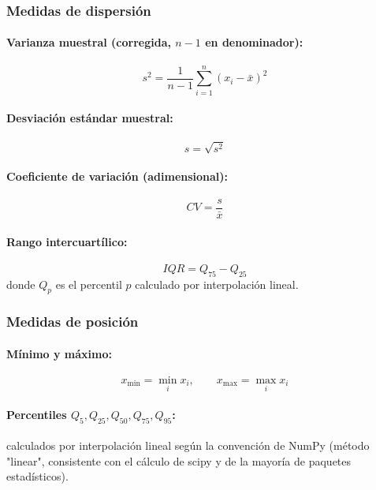 \documentclass[12pt,a4paper,oneside]{book}
\begin{document}
\subsubsection{Medidas de dispersión}

\paragraph{Varianza muestral (corregida, $n-1$ en denominador):}
\begin{equation}
s^2 = \frac{1}{n-1}\sum_{i=1}^{n}(x_i - \bar{x})^2
\end{equation}

\paragraph{Desviación estándar muestral:}
\begin{equation}
s = \sqrt{s^2}
\end{equation}

\paragraph{Coeficiente de variación (adimensional):}
\begin{equation}
CV = \frac{s}{\bar{x}}
\end{equation}

\paragraph{Rango intercuartílico:}
\begin{equation}
IQR = Q_{75} - Q_{25}
\end{equation}
donde $Q_p$ es el percentil $p$ calculado por interpolación lineal.

\subsubsection{Medidas de posición}

\paragraph{Mínimo y máximo:}
\begin{equation}
x_{\min} = \min_{i} x_i, \qquad x_{\max} = \max_{i} x_i
\end{equation}

\paragraph{Percentiles $Q_5, Q_{25}, Q_{50}, Q_{75}, Q_{95}$:}
calculados por interpolación lineal según la convención de NumPy (método "linear", consistente con el cálculo de scipy y de la mayoría de paquetes estadísticos).
\end{document}
